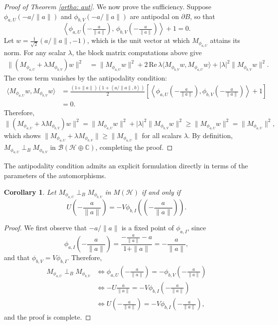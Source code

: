 \documentclass[12pt]{amsart}
\newtheorem{corollary}[theorem]{Corollary}
\theoremstyle{definition}
\renewcommand{\H}{\mathcal{H}}
\begin{document}
\begin{proof}[Proof of Theorem \ref{ortho: aut}]
\medskip

\noindent We now prove the sufficiency. Suppose $\phi_{a,U}\!\left(-a/\|a\|\right)$ 
and $\phi_{b,V}\!\left(-a/\|a\|\right)$ are antipodal on 
$\partial B$, so that
\[
\left\langle\phi_{a,U}\!\left(-\tfrac{a}{\|a\|}\right),\, 
\phi_{b,V}\!\left(-\tfrac{a}{\|a\|}\right)\right\rangle + 1 = 0.
\]
Let $w = \frac{1}{\sqrt{2}}\left(a/\|a\|, -1\right)$, which 
is the unit vector at which $M_{\phi_{a,U}}$ attains its norm. For any 
scalar $\lambda$, the block matrix computations above give
\begin{align*}
\|(M_{\phi_{a,U}}+\lambda M_{\phi_{b,V}})w\|^2 
&= \|M_{\phi_{a,U}}w\|^2 
+ 2\,\mathrm{Re}\,\lambda\langle M_{\phi_{b,V}}w, M_{\phi_{a,U}}w\rangle 
+ |\lambda|^2\|M_{\phi_{b,V}}w\|^2.
\end{align*}
The cross term vanishes by the antipodality condition:
\begin{align*}
\langle M_{\phi_{a,U}}w, M_{\phi_{b,V}}w\rangle 
& = \frac{(1+\|a\|)\left(1+\left\langle a/\|a\|,b\right\rangle\right)}{2}
\left[\left\langle\phi_{a,U}\!\left(-\tfrac{a}{\|a\|}\right),
\phi_{b,V}\!\left(-\tfrac{a}{\|a\|}\right)\right\rangle 
+ 1\right]\\
& = 0.
\end{align*}
Therefore,
\[
\|(M_{\phi_{a,U}}+\lambda M_{\phi_{b,V}})w\|^2 
= \|M_{\phi_{a,U}}w\|^2 + |\lambda|^2\|M_{\phi_{b,V}}w\|^2 
\geq \|M_{\phi_{a,U}}w\|^2 = \|M_{\phi_{a,U}}\|^2,
\]
which shows $\|M_{\phi_{a,U}}+\lambda M_{\phi_{b,V}}\| \geq \|M_{\phi_{a,U}}\|$ for 
all scalars $\lambda$. By definition, $M_{\phi_{a,U}} \perp_B M_{\phi_{b,V}}$ 
in $\mathcal{B}(\mathcal{H}\oplus\mathbb{C})$, completing the proof.
\end{proof}

\noindent The antipodality condition admits an explicit 
formulation directly in terms of the parameters of the 
automorphisms.

\begin{corollary}\label{cor: ortho}
Let $M_{\phi_{a,U}}\perp_B M_{\phi_{b,V}}$ in $M \left(\H \right)$ if and only if 
\[
U \left(-\frac{a}{\|a\|} \right)=-V\phi_{b,I} \left( \left(-\frac{a}{\|a\|} \right) \right).
\]
\end{corollary}

\begin{proof}
We first observe that $-a/\|a\|$ is a fixed point of 
$\phi_{a,I}$, since
\[
\phi_{a,I}\left(-\frac{a}{\|a\|}\right) 
= \frac{-\frac{a}{\|a\|} - a}{1 + \|a\|} 
= -\frac{a}{\|a\|},
\]
and that $\phi_{b,V} = V\phi_{b,I}$. Therefore,
\begin{align*}
M_{\phi_{a,U}} \perp_B M_{\phi_{b,V}} 
&\iff \phi_{a,U}\!\left(-\tfrac{a}{\|a\|}\right) 
= -\phi_{b,V}\!\left(-\tfrac{a}{\|a\|}\right)\\
&\iff -U\tfrac{a}{\|a\|} 
= -V\phi_{b,I}\!\left(-\tfrac{a}{\|a\|}\right)\\
&\iff U\!\left(-\tfrac{a}{\|a\|}\right) 
= -V\phi_{b,I}\!\left(-\tfrac{a}{\|a\|}\right),
\end{align*}
and the proof is complete.
\end{proof}
\end{document}
